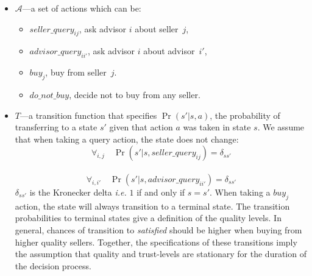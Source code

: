 \documentclass{aamas2014}
\newlength{\EqSpace}
\begin{document}
\begin{itemize}
\item $\mathcal{A}$---a set of actions which can be:\\[-1.8em]
        \begin{itemize}
            \item $seller\_query_{ij}$, ask advisor $i$ about seller~$j$,
            \item $advisor\_query_{ii'}$, ask advisor $i$ about advisor~$i'$,
            \item $buy_{j}$, buy from seller~$j$.
            \item $do\_not\_buy$, decide not to buy from any seller.
        \end{itemize}
    \vspace{-1em}
\item $T$---a transition function that specifies $\Pr(s'|s,a)$, the probability of transferring to a state $s'$ given that action $a$ was taken in state $s$. We assume that when taking a query action, the state does not change:
        \begin{equation}
            \forall_{i,j}\quad\Pr(s'|s,seller\_query_{ij})=\delta_{ss'}
        \end{equation}
        \\[\EqSpace]
        \begin{equation}
            \forall_{i,i'}\quad\Pr(s'|s,advisor\_query_{ii'})=\delta_{ss'}
        \end{equation}
    $\delta_{ss'}$ is the Kronecker delta \textit{i.e.} $1$ if and only if $s=s'$. When taking a $buy_{j}$ action, the state will always transition to a terminal state. The transition probabilities to terminal states give a definition of the quality levels. In general, chances of transition to \textit{satisfied} should be higher when buying from higher quality sellers. Together, the specifications of these transitions imply the assumption that quality and trust-levels are stationary for the duration of the decision process.


\end{itemize}
\end{document}
